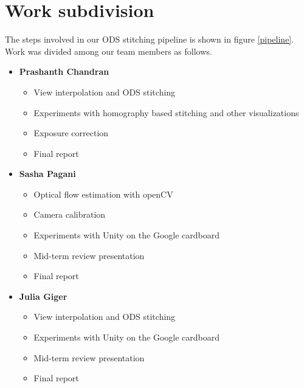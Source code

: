 \documentclass[10pt,twocolumn,letterpaper]{article}
\begin{document}
\section{Work subdivision}
\label{work-division}
The steps involved in our ODS stitching pipeline is shown in figure \ref{pipeline}. Work was divided among our team members as follows. 
\begin{itemize}
\item \textbf{Prashanth Chandran}
\begin{itemize}
\item View interpolation and ODS stitching
\item Experiments with homography based stitching and other visualizations
\item Exposure correction
\item Final report
\end{itemize}
\item \textbf{Sasha Pagani}
\begin{itemize}
\item Optical flow estimation with openCV
\item Camera calibration
\item Experiments with Unity on the Google cardboard
\item Mid-term review presentation
\item Final report
\end{itemize}
\item \textbf{Julia Giger}
\begin{itemize}
\item View interpolation and ODS stitching
\item Experiments with Unity on the Google cardboard
\item Mid-term review presentation
\item Final report
\end{itemize}
\end{itemize}

\end{document}
